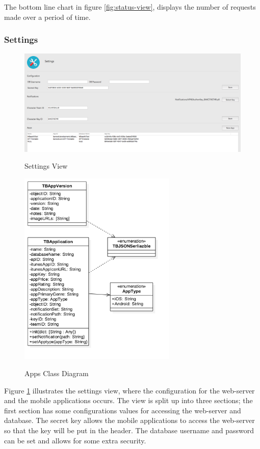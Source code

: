 The bottom line chart in figure \ref{fig:status-view}, displays the number of requests made over a period of time.

\subsubsection{Settings}

\begin{figure}[!h]
    \caption{Settings View}
    \centering
    \includegraphics[width=150mm]{images/dashboard/settings}
    \label{fig:settings-view}
\end{figure} 


\begin{figure}[!h]
    \caption{Apps Class Diagram}
    \centering
    \includegraphics[width=75mm]{images/classdiagrams/Settings}
    \label{fig:settings-cd}
\end{figure} 

Figure \ref{fig:settings-view} illustrates the settings view, where the configuration for the web-server and the mobile applications occurs. The view is split up into three sections; the first section has some configurations values for accessing the web-server and database. The secret key allows the mobile applications to access the web-server so that the key will be put in the header. The database username and password can be set and allows for some extra security.

